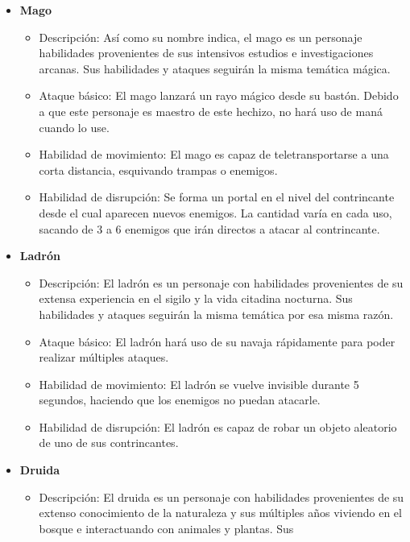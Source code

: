 \begin{itemize}
    \item \textbf{Mago}
    \begin{itemize}
        \item Descripción: Así como su nombre indica, el mago es un personaje
        habilidades provenientes de sus intensivos estudios e
        investigaciones arcanas. Sus habilidades y ataques seguirán la misma
        temática mágica.
        \item Ataque básico: El mago lanzará un rayo mágico desde su bastón.
        Debido a que este personaje es maestro de este hechizo, no hará uso de
        maná cuando lo use.
        \item Habilidad de movimiento: El mago es capaz de teletransportarse a
        una corta distancia, esquivando trampas o enemigos.
        \item Habilidad de disrupción: Se forma un portal en el nivel del
        contrincante desde el cual aparecen nuevos enemigos. La cantidad varía
        en cada uso, sacando de 3 a 6 enemigos que irán directos a atacar al
        contrincante.
    \end{itemize}
    \item \textbf{Ladrón}
    \begin{itemize}
        \item Descripción: El ladrón es un personaje con habilidades
        provenientes de su extensa experiencia en el sigilo y la vida citadina
        nocturna. Sus habilidades y ataques seguirán la misma temática por esa
        misma razón.
        \item Ataque básico: El ladrón hará uso de su navaja rápidamente para
        poder realizar múltiples ataques.
        \item Habilidad de movimiento: El ladrón se vuelve invisible durante 5
        segundos, haciendo que los enemigos no puedan atacarle.
        \item Habilidad de disrupción: El ladrón es capaz de robar un objeto
        aleatorio de uno de sus contrincantes.
    \end{itemize}
    \item \textbf{Druida}
    \begin{itemize}
        \item Descripción: El druida es un personaje con habilidades
        provenientes de su extenso conocimiento de la naturaleza y sus múltiples
        años viviendo en el bosque e interactuando con animales y plantas. Sus

\end{itemize}
\end{itemize}
